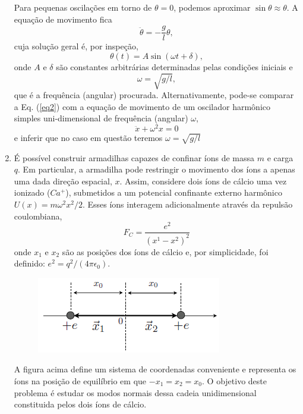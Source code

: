 \begin{enumerate}[start=1,label={\bfseries Q\arabic*.}]
\resposta Para pequenas oscilações em torno de $\theta = 0$, podemos aproximar $\sin \theta \approx \theta$. A equação de movimento fica
%
\begin{equation}
  \ddot{\theta} = - \frac{g}{l} \theta ,
\end{equation}
%
cuja solução geral é, por inspeção,
\begin{equation}
  \theta (t) = A \sin (\omega t + \delta) ,
\end{equation}
%
onde $A$ e $\delta$ são constantes arbitrárias determinadas pelas condições iniciais e
%
\begin{equation}
  \omega = \sqrt{g/l} , 
\end{equation}
%
que é a frequência (angular) procurada. Alternativamente, pode-se comparar a Eq. (\ref{eq2}) com a equação de movimento de um oscilador harmônico simples uni-dimensional de frequência (angular) $\omega$,
%
\begin{equation}
  \ddot{x} + \omega^{2} x = 0
\end{equation}
%
e inferir que no caso em questão teremos $\omega = \sqrt{g/l}$




\item É possível construir armadilhas capazes de confinar íons de massa $m$ e carga $q$. Em particular, a armadilha pode restringir o movimento dos íons a apenas uma dada direção espacial, $x$. Assim, considere dois íons de cálcio uma vez ionizado ($Ca^{+}$), submetidos a um potencial confinante externo harmônico $U(x) = m\omega^{2}x^{2}/2$. Esses íons interagem adicionalmente através da repulsão coulombiana,
$$
F_{C} = \frac{e^{2}}{ \left( x^{1} - x^{2} \right)^{2} }
$$
onde $x_{1}$ e $x_{2}$ são as posições dos íons de cálcio e, por simplicidade, foi definido: $e^{2} = q^{2} / (4\pi \epsilon_{0})$.
\begin{figure}[H]
\centering
\includegraphics[scale=1]{classica-img/particula.png}
\end{figure}
A figura acima define um sistema de coordenadas conveniente e representa os íons na posição de equilíbrio em que $-x_{1} = x_{2} = x_{0}$. O objetivo deste problema é estudar os modos normais dessa cadeia unidimensional constituida pelos dois íons de cálcio.



\end{enumerate}
